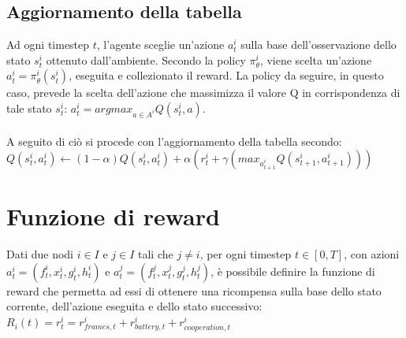\documentclass{article}
\begin{document}
\subsection{Aggiornamento della tabella}
Ad ogni timestep $t$, l'agente sceglie un'azione $a_t^i$ sulla base dell'osservazione dello stato $s_t^i$ ottenuto dall'ambiente. Secondo la policy $\pi_{\theta}^i$, viene scelta un'azione $a_t^i = \pi_\theta^i(s_t^i)$, eseguita e collezionato il reward. La policy da seguire, in questo caso, prevede la scelta  dell'azione che massimizza il valore Q in corrispondenza di tale stato $s_t^i$: $a_t^i = argmax_{a \in A^i} Q(s_t^i, a)$.\\\\ A seguito di ciò si procede con l'aggiornamento della tabella secondo:\\

$Q(s_t^i, a_t^i) \leftarrow (1-\alpha)Q(s_t^i, a_t^i) + \alpha(r_t^i + \gamma(max_{a_{t+1}^i} Q(s_{t+1}^i, a_{t+1}^i)))$

\section{Funzione di reward}
Dati due nodi $i \in I$ e $j \in I$ tali che $j \neq i$, per ogni timestep $t \in [0, T]$, con azioni $a_t^i = (f_t^i, x_t^i, g_t^i, h_t^i)$ e $a_t^j = (f_t^j, x_t^j, g_t^j, h_t^j)$, è possibile definire la funzione di reward che permetta ad essi di ottenere una ricompensa sulla base dello stato corrente, dell'azione eseguita e dello stato successivo:\\

$R_i(t) = r_t^i = r_{frames, t}^i + r_{battery, t}^i + r_{cooperation, t}^i$ 
\begin{algorithm}
    \caption{Algoritmo per ricompensa per gestione delle frame, $r_{frames, t}^i$}\label{alg:cap}
    \begin{algoerithmic}
    \Else
    \EndIf
    \end{algoerithmic}
\end{algorithm}
\end{document}

